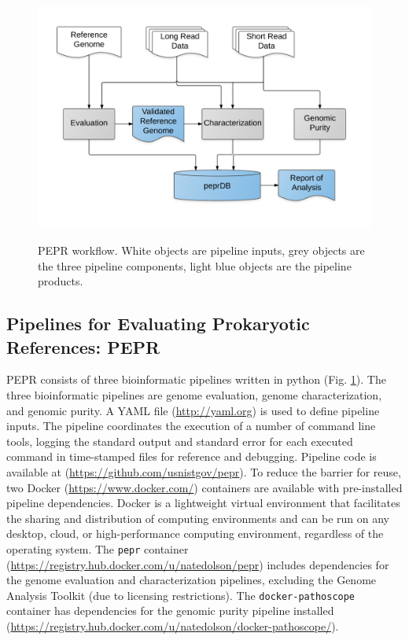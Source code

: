 \documentclass[smallextended]{svjour3}\usepackage[]{graphicx}\usepackage[]{color}
\begin{document}
\begin{figure}
\includegraphics[width=\textwidth]{pepr-workflow.png}
\label{fig:workflowFig}
\caption{PEPR workflow. White objects are pipeline inputs, grey objects are the three pipeline components, light blue objects are the pipeline products.}
\end{figure}


\subsection{Pipelines for Evaluating Prokaryotic References: PEPR}
PEPR consists of three bioinformatic pipelines written in python (Fig. \ref{fig:workflowFig}). 
The three bioinformatic pipelines are genome evaluation, genome characterization, and genomic purity. 
A YAML file (\url{http://yaml.org}) is used to define pipeline inputs. 
The pipeline coordinates the execution of a number of command line tools, logging the standard output and standard error for each executed command in time-stamped files for reference and debugging. 
Pipeline code is available at (\url{https://github.com/usnistgov/pepr}). 
To reduce the barrier for reuse, two Docker (\url{https://www.docker.com/}) containers are available with pre-installed pipeline dependencies. 
Docker is a lightweight virtual environment that facilitates the sharing and distribution of computing environments and can be run on any desktop, cloud, or high-performance computing environment, regardless of the operating system. 
The \texttt{pepr} container (\url{https://registry.hub.docker.com/u/natedolson/pepr}) includes dependencies for the genome evaluation and characterization pipelines, excluding the Genome Analysis Toolkit (due to licensing restrictions). 
The \texttt{docker-pathoscope} container has dependencies for the genomic purity pipeline installed (\url{https://registry.hub.docker.com/u/natedolson/docker-pathoscope/}).
\end{document}
